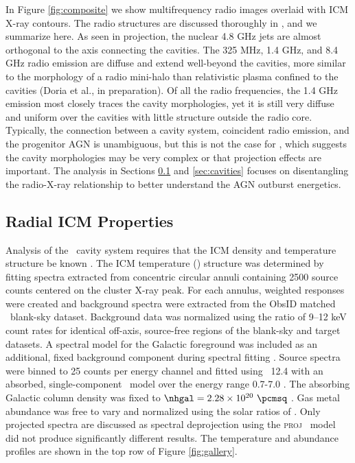 \documentclass[iop]{emulateapj}
\begin{document}
In Figure \ref{fig:composite} we show multifrequency radio images
overlaid with ICM X-ray contours. The radio structures are discussed
thoroughly in \citet{gitti06}, and we summarize here. As seen in
projection, the nuclear 4.8 GHz jets are almost orthogonal to the axis
connecting the cavities. The 325 MHz, 1.4 GHz, and 8.4 GHz radio
emission are diffuse and extend well-beyond the cavities, more similar
to the morphology of a radio mini-halo than relativistic plasma
confined to the cavities (Doria et al., in preparation). Of all the
radio frequencies, the 1.4 GHz emission most closely traces the cavity
morphologies, yet it is still very diffuse and uniform over the
cavities with little structure outside the radio core. Typically, the
connection between a cavity system, coincident radio emission, and the
progenitor AGN is unambiguous, but this is not the case for \rbs,
which suggests the cavity morphologies may be very complex or that
projection effects are important. The analysis in Sections
\ref{sec:icm} and \ref{sec:cavities} focuses on disentangling the
radio-X-ray relationship to better understand the AGN outburst
energetics.

\subsection{Radial ICM Properties}
\label{sec:icm}

Analysis of the \rbs\ cavity system requires that the ICM density and
temperature structure be known \citep[see][for details]{mcnamrev}. The
ICM temperature (\tx) structure was determined by fitting spectra
extracted from concentric circular annuli containing 2500 source
counts centered on the cluster X-ray peak. For each annulus, weighted
responses were created and background spectra were extracted from the
ObsID matched \caldb\ blank-sky dataset. Background data was
normalized using the ratio of 9--12 keV count rates for identical
off-axis, source-free regions of the blank-sky and target datasets. A
spectral model for the Galactic foreground was included as an
additional, fixed background component during spectral fitting
\citep{2005ApJ...628..655V, xrayband}. Source spectra were binned to
25 counts per energy channel and fitted using \xspec\ 12.4
\citep{xspec} with an absorbed, single-component \mekal\ model
\citep{mekal1} over the energy range 0.7-7.0 \keV. The absorbing
Galactic column density was fixed to $\nhgal = 2.28 \times 10^{20}
~\pcmsq$ \citep{lab}. Gas metal abundance was free to vary and
normalized using the solar ratios of \citet{ag89}. Only projected
spectra are discussed as spectral deprojection using the
{\textsc{proj}} \xspec\ model did not produce significantly different
results. The temperature and abundance profiles are shown in the top
row of Figure \ref{fig:gallery}.
\end{document}
